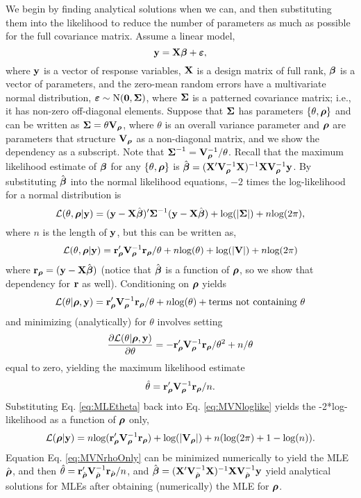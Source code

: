 \documentclass[11pt, titlepage]{article}\usepackage[]{graphicx}\usepackage[]{color}
\begin{document}
We begin by finding analytical solutions when we can, and then substituting them into the likelihood to reduce the number of parameters as much as possible for the full covariance matrix.  Assume a linear model,
\[
  \mathbf{y} = \mathbf{X}{\boldsymbol{\beta}} + \mbox{\boldmath $\varepsilon$},
\]
where $\mathbf{y}$ is a vector of response variables, $\mathbf{X}$ is a design matrix of full rank, ${\boldsymbol{\beta}}$ is a vector of parameters, and the zero-mean random errors have a multivariate normal distribution, $\mbox{\boldmath $\varepsilon$} \sim \textrm{N}(\mathbf{0},\mbox{\boldmath $\Sigma$})$, where $\mbox{\boldmath $\Sigma$}$ is a patterned covariance matrix; i.e., it has non-zero off-diagonal elements.  Suppose that $\mbox{\boldmath $\Sigma$}$ has parameters $\{\theta,{\boldsymbol{\rho}}\}$ and can be written as $\mbox{\boldmath $\Sigma$} = \theta\mathbf{V}_{{\boldsymbol{\rho}}}$, where $\theta$ is an overall variance parameter and ${\boldsymbol{\rho}}$ are parameters that structure $\mathbf{V}_{{\boldsymbol{\rho}}}$ as a non-diagonal matrix, and we show the dependency as a subscript. Note that $\mbox{\boldmath $\Sigma$}^{-1} = \mathbf{V}^{-1}_{{\boldsymbol{\rho}}}/\theta$. Recall that the maximum likelihood estimate of ${\boldsymbol{\beta}}$ for any $\{\theta,{\boldsymbol{\rho}}\}$ is $\hat{{\boldsymbol{\beta}}} = (\mathbf{X}^{\prime}\mathbf{V}^{-1}_{{\boldsymbol{\rho}}}\mathbf{X})^{-1}\mathbf{X}\mathbf{V}^{-1}_{{\boldsymbol{\rho}}}\mathbf{y}$. By substituting $\hat{{\boldsymbol{\beta}}}$ into the normal likelihood equations, $-2$ times the log-likelihood for a normal distribution is
\[
  \mathcal{L}(\theta,{\boldsymbol{\rho}}|\mathbf{y}) = (\mathbf{y} - \mathbf{X}\hat{{\boldsymbol{\beta}}})^{\prime}\mbox{\boldmath $\Sigma$}^{-1}(\mathbf{y} - \mathbf{X}\hat{{\boldsymbol{\beta}}}) + \textrm{log}(|\mbox{\boldmath $\Sigma$}|) + n\textrm{log}(2\pi),
\]
where $n$ is the length of $\mathbf{y}$, but this can be written as,
\begin{equation}\label{eq:MVNloglike}
\mathcal{L}(\theta,{\boldsymbol{\rho}}|\mathbf{y}) = \mathbf{r}_{{\boldsymbol{\rho}}}^{\prime}\mathbf{V}^{-1}_{{\boldsymbol{\rho}}}\mathbf{r}_{{\boldsymbol{\rho}}}/\theta + n\textrm{log}(\theta) + \textrm{log}(|\mathbf{V}|) + n\textrm{log}(2\pi)
\end{equation}
where $\mathbf{r}_{{\boldsymbol{\rho}}} = (\mathbf{y} - \mathbf{X}\hat{{\boldsymbol{\beta}}})$ (notice that $\hat{{\boldsymbol{\beta}}}$ is a function of ${\boldsymbol{\rho}}$, so we show that dependency for $\mathbf{r}$ as well).  Conditioning on ${\boldsymbol{\rho}}$ yields 
\[
\mathcal{L}(\theta|{\boldsymbol{\rho}},\mathbf{y}) = \mathbf{r}_{{\boldsymbol{\rho}}}^{\prime}\mathbf{V}^{-1}_{{\boldsymbol{\rho}}}\mathbf{r}_{{\boldsymbol{\rho}}}/\theta + n\textrm{log}(\theta)+ \textrm{terms not containing } \theta
\]
and minimizing (analytically) for $\theta$ involves setting
\[
\frac{\partial \mathcal{L}(\theta|{\boldsymbol{\rho}},\mathbf{y})}{\partial \theta} = -\mathbf{r}^{\prime}_{{\boldsymbol{\rho}}}\mathbf{V}^{-1}_{{\boldsymbol{\rho}}}\mathbf{r}_{{\boldsymbol{\rho}}}/\theta^2 + n/\theta
\]
equal to zero, yielding the maximum likelihood estimate
\begin{equation}\label{eq:MLEtheta}
 \hat{\theta} = \mathbf{r}^{\prime}_{{\boldsymbol{\rho}}}\mathbf{V}^{-1}_{{\boldsymbol{\rho}}}\mathbf{r}_{{\boldsymbol{\rho}}}/n.
\end{equation}
Substituting Eq. \ref{eq:MLEtheta} back into Eq. \ref{eq:MVNloglike} yields the -2*log-likelihood as a function of ${\boldsymbol{\rho}}$ only,
\begin{equation}\label{eq:MVNrhoOnly}
\mathcal{L}({\boldsymbol{\rho}}|\mathbf{y}) = n\textrm{log}(\mathbf{r}^{\prime}_{{\boldsymbol{\rho}}}\mathbf{V}^{-1}_{{\boldsymbol{\rho}}}\mathbf{r}_{{\boldsymbol{\rho}}}) + \textrm{log}(|\mathbf{V}_{{\boldsymbol{\rho}}}|) + n(\textrm{log}(2\pi) + 1 - \textrm{log}(n)). 
\end{equation}
Equation Eq. \ref{eq:MVNrhoOnly} can be minimized numerically to yield the MLE $\hat{{\boldsymbol{\rho}}}$, and then $\hat{\theta} = \mathbf{r}^{\prime}_{\hat{{\boldsymbol{\rho}}}}\mathbf{V}^{-1}_{\hat{{\boldsymbol{\rho}}}}\mathbf{r}_{\hat{{\boldsymbol{\rho}}}}/n$, and  $\hat{{\boldsymbol{\beta}}} = (\mathbf{X}^{\prime}\mathbf{V}^{-1}_{\hat{{\boldsymbol{\rho}}}}\mathbf{X})^{-1}\mathbf{X}\mathbf{V}^{-1}_{\hat{{\boldsymbol{\rho}}}}\mathbf{y}$ yield analytical solutions for MLEs after obtaining (numerically) the MLE for ${\boldsymbol{\rho}}$.
\end{document}
